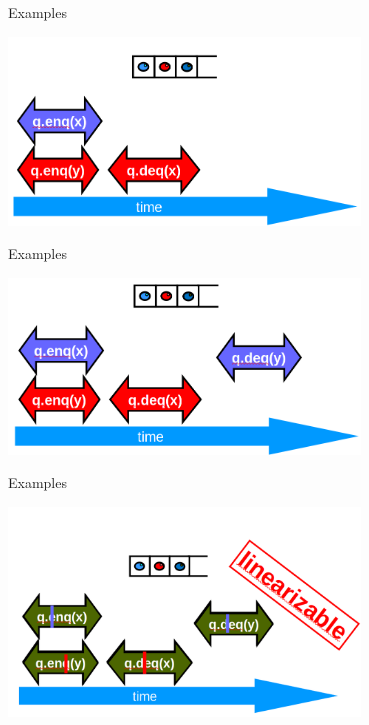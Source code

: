 \begin{frame}{Examples}
\begin{center} \includegraphics[width=0.7\textwidth]{./pics/linear/61.png} \end{center}
\end{frame}

\begin{frame}{Examples}
\begin{center} \includegraphics[width=0.7\textwidth]{./pics/linear/62.png} \end{center}
\end{frame}

\begin{frame}{Examples}
\begin{center} \includegraphics[width=0.7\textwidth]{./pics/linear/63.png} \end{center}
\end{frame}



